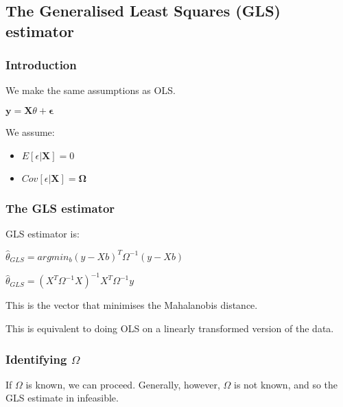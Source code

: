 
\subsection{The Generalised Least Squares (GLS) estimator}

\subsubsection{Introduction}

We make the same assumptions as OLS.

\(\mathbf {y}=\mathbf {X}\theta+\boldsymbol {\epsilon }\)

We assume:

\begin{itemize}
\item \(E[\epsilon |\boldsymbol X]=0\)
\item \(Cov [\epsilon |\boldsymbol X]=\boldsymbol \Omega \)
\end{itemize}

\subsubsection{The GLS estimator}

GLS estimator is:

\(\hat \theta_{GLS} = argmin_b (y-Xb)^T\Omega^{-1}(y-Xb)\)

\(\hat \theta_{GLS}=(X^T\Omega ^{-1}X)^{-1}X^T\Omega^{-1}y\)

This is the vector that minimises the Mahalanobis distance.

This is equivalent to doing OLS on a linearly transformed version of the data.

\subsubsection{Identifying \(\Omega \)}

If \(\Omega \) is known, we can proceed. Generally, however, \(\Omega \) is not known, and so the GLS estimate in infeasible.

